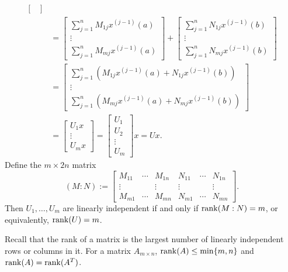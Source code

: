 \documentclass[10.5pt, oneside, a4paper]{article}
\begin{document}
\begin{rmk}
{\begin{align*}
\begin{bmatrix}
            \end{bmatrix}\\
            &= \begin{bmatrix}
                \sum_{j=1}^n M_{1j}x^{(j-1)}(a)\\
                \vdots\\
                \sum_{j=1}^n M_{mj}x^{(j-1)}(a)
            \end{bmatrix} + \begin{bmatrix}
                \sum_{j=1}^n N_{1j}x^{(j-1)}(b)\\
                \vdots\\
                \sum_{j=1}^n N_{mj}x^{(j-1)}(b)
            \end{bmatrix}\\
            &= \begin{bmatrix}
                \sum_{j=1}^n (M_{1j}x^{(j-1)}(a) + N_{1j}x^{(j-1)}(b))\\
                \vdots\\
                \sum_{j=1}^n (M_{mj}x^{(j-1)}(a) + N_{mj}x^{(j-1)}(b))
            \end{bmatrix}\\
            &= \begin{bmatrix}
                U_1 x\\
                \vdots\\
                U_m x
            \end{bmatrix} = \begin{bmatrix}U_1\\ U_2\\ \vdots \\ U_m
            \end{bmatrix}x = Ux.
    \end{align*}
    }
    Define the $m\times 2n$ matrix
    \[(M:N):=\begin{bmatrix}
        M_{11} & \cdots & M_{1n} & N_{11} & \cdots & N_{1n}\\
        \vdots &  & \vdots & \vdots & & \vdots\\
        M_{m1} & \cdots & M_{mn} & N_{m1} & \cdots & N_{mn}
    \end{bmatrix}.\]
    Then $U_1,\ldots,U_m$ are linearly independent if and only if $\operatorname{rank}(M:N)=m$, or equivalently, $\operatorname{rank}(U)=m$. 
    {\color{blue}
    Recall that the rank of a matrix is the largest number of linearly independent rows or columns in it. For a matrix $A_{m\times n}$, $\operatorname{rank}(A)\leq \min\{m,n\}$ and $\operatorname{rank}(A)=\operatorname{rank}(A^T)$.

}
\end{rmk}
\end{document}
